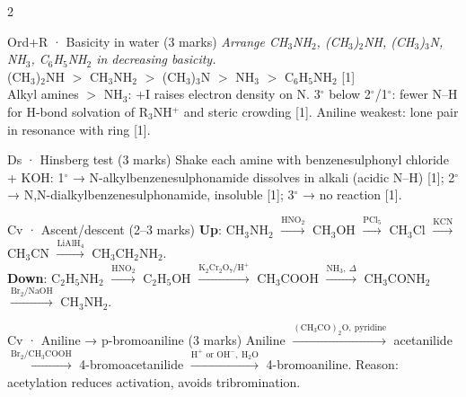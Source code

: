 \documentclass[10pt,a4paper]{extarticle}
\newcommand{\mk}[1]{{\scriptsize\color{black!55}[#1]}}
\begin{document}
\begin{multicols}{2}
\begin{skel}{Ord+R · Basicity in water (3 marks)}
\textit{Arrange CH$_3$NH$_2$, (CH$_3$)$_2$NH, (CH$_3$)$_3$N, NH$_3$, C$_6$H$_5$NH$_2$ in decreasing basicity.}\\
(CH$_3$)$_2$NH $>$ CH$_3$NH$_2$ $>$ (CH$_3$)$_3$N $>$ NH$_3$ $>$ C$_6$H$_5$NH$_2$ \mk{1}\\
Alkyl amines $>$ NH$_3$: +I raises electron density on N. 3$^\circ$ below 2$^\circ$/1$^\circ$: fewer N--H for H-bond solvation of R$_3$NH$^+$ and steric crowding \mk{1}. Aniline weakest: lone pair in resonance with ring \mk{1}.
\end{skel}
\begin{skel}{Ds · Hinsberg test (3 marks)}
Shake each amine with benzenesulphonyl chloride + KOH: 1$^\circ$ → N-alkylbenzenesulphonamide dissolves in alkali (acidic N--H) \mk{1}; 2$^\circ$ → N,N-dialkylbenzenesulphonamide, insoluble \mk{1}; 3$^\circ$ → no reaction \mk{1}.
\end{skel}
\begin{skel}{Cv · Ascent/descent (2--3 marks)}
\textbf{Up}: CH$_3$NH$_2$ $\xrightarrow{\text{HNO}_2}$ CH$_3$OH $\xrightarrow{\text{PCl}_5}$ CH$_3$Cl $\xrightarrow{\text{KCN}}$ CH$_3$CN $\xrightarrow{\text{LiAlH}_4}$ CH$_3$CH$_2$NH$_2$.\\
\textbf{Down}: C$_2$H$_5$NH$_2$ $\xrightarrow{\text{HNO}_2}$ C$_2$H$_5$OH $\xrightarrow{\text{K}_2\text{Cr}_2\text{O}_7/\text{H}^+}$ CH$_3$COOH $\xrightarrow{\text{NH}_3,\ \Delta}$ CH$_3$CONH$_2$ $\xrightarrow{\text{Br}_2/\text{NaOH}}$ CH$_3$NH$_2$.
\end{skel}
\begin{skel}{Cv · Aniline → p-bromoaniline (3 marks)}
Aniline $\xrightarrow{(\text{CH}_3\text{CO})_2\text{O},\ \text{pyridine}}$ acetanilide $\xrightarrow{\text{Br}_2/\text{CH}_3\text{COOH}}$ 4-bromoacetanilide $\xrightarrow{\text{H}^+\text{ or OH}^-,\ \text{H}_2\text{O}}$ 4-bromoaniline. Reason: acetylation reduces activation, avoids tribromination.
\end{skel}


\end{multicols}
\end{document}
